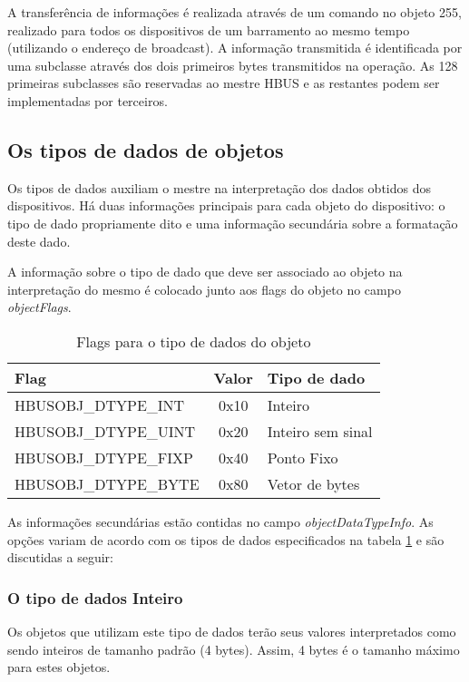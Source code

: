 \documentclass[11pt]{report}
\begin{document}
A transferência de informações é realizada através de um comando  no objeto 255, realizado para todos os dispositivos de um barramento ao mesmo tempo (utilizando o endereço de broadcast). A informação transmitida é identificada por uma subclasse através dos dois primeiros bytes transmitidos na operação. As 128 primeiras subclasses são reservadas ao mestre HBUS e as restantes podem ser implementadas por terceiros.


\subsection{Os tipos de dados de objetos}

Os tipos de dados auxiliam o mestre na interpretação dos dados obtidos dos dispositivos. Há duas informações principais para cada objeto do dispositivo: o tipo de dado propriamente dito e uma informação secundária sobre a formatação deste dado.

A informação sobre o tipo de dado que deve ser associado ao objeto na interpretação do mesmo é colocado junto aos flags do objeto no campo \textit{objectFlags}.

\begin{table}[H]
\centering
\label{table:datatypes}
\caption{Flags para o tipo de dados do objeto}
\begin{tabular}{l c l}
\hline
Flag					&	Valor	& Tipo de dado\\
\hline
HBUSOBJ\_DTYPE\_INT	&	0x10		& Inteiro\\
HBUSOBJ\_DTYPE\_UINT	&	0x20		& Inteiro sem sinal\\
HBUSOBJ\_DTYPE\_FIXP	&	0x40		& Ponto Fixo\\
HBUSOBJ\_DTYPE\_BYTE	&	0x80		& Vetor de bytes\\
\hline
\end{tabular}
\end{table}

As informações secundárias estão contidas no campo \textit{objectDataTypeInfo}. As opções variam de acordo com os tipos de dados especificados na tabela \ref{table:datatypes} e são discutidas a seguir:

\subsubsection*{O tipo de dados Inteiro}

Os objetos que utilizam este tipo de dados terão seus valores interpretados como sendo inteiros de tamanho padrão (4 bytes). Assim, 4 bytes é o tamanho máximo para estes objetos.
\end{document}
